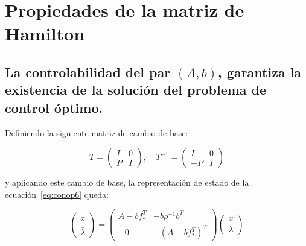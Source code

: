 
    \newpage
    \section{Propiedades de la matriz de Hamilton}


        \subsection{La controlabilidad del par $(A, b)$, garantiza la existencia de la solución del problema de control óptimo.}

            Definiendo la siguiente matriz de cambio de base:

            \begin{equation}
                T =
                \begin{pmatrix}
                    I & 0 \\
                    P & I
                \end{pmatrix}, \quad T^{-1} =
                \begin{pmatrix}
                    I & 0 \\
                    -P & I
                \end{pmatrix}
            \end{equation}

            y aplicando este cambio de base, la representación de estado de la ecuación~\ref{eq:conop6} queda:

            \begin{equation} \label{eq:conop10}
                \begin{pmatrix}
                    \dot{x} \\
                    \dot{\bar{\lambda}}
                \end{pmatrix} =
                \begin{pmatrix}
                    A - b f_*^T & -b \rho^{-1} b^T \\
                    -0 & - (A - b f_*^T)^T
                \end{pmatrix}
                \begin{pmatrix}
                    x \\
                    \bar{\lambda}
                \end{pmatrix}
            \end{equation}

